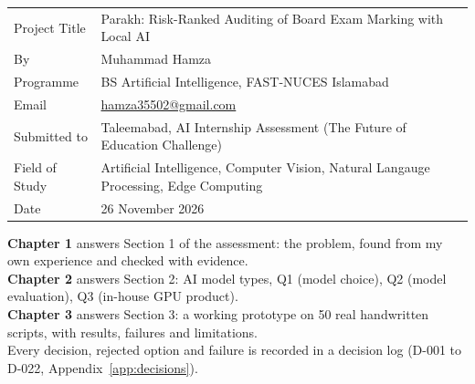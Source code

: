 \thispagestyle{fancy}
\noindent
\begin{tabular}{@{}p{3.6cm}p{11cm}@{}}
Project Title & Parakh: Risk-Ranked Auditing of Board Exam Marking with Local AI\\[4pt]
By & Muhammad Hamza \\[4pt]
Programme & BS Artificial Intelligence, FAST-NUCES Islamabad \\[4pt]
Email & \href{mailto:hamza35502@gmail.com}{hamza35502@gmail.com} \\[4pt]
Submitted to & Taleemabad, AI Internship Assessment (The Future of Education Challenge) \\[4pt]
Field of Study & Artificial Intelligence, Computer Vision, Natural Langauge Processing, Edge Computing\\[4pt]
Date & 26 November 2026 \\
\end{tabular}

\vspace{1cm}
\begin{keybox}
\textbf{Chapter 1} answers Section 1 of the assessment: the problem, found from my own experience and checked with evidence. \\
\textbf{Chapter 2} answers Section 2: AI model types, Q1 (model choice), Q2 (model evaluation), Q3 (in-house GPU product). \\
\textbf{Chapter 3} answers Section 3: a working prototype on 50 real handwritten scripts, with results, failures and limitations. \\
Every decision, rejected option and failure is recorded in a decision log (D-001 to D-022, Appendix~\ref{app:decisions}).
\end{keybox}
\clearpage
